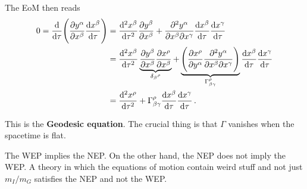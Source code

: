 \documentclass[main.tex]{subfiles}
\begin{document}
The EoM then reads 
%
\begin{subequations}
\begin{align}
0 = \dv{}{\tau } \qty(\pdv{y^{\alpha }}{x^{\beta }} \dv{x^{\beta }}{\tau }) 
&=  \dv[2]{x^{\beta }}{\tau } \pdv{y^{\beta }}{x^{\beta }} 
+ \pdv[2]{y^{\alpha }}{x^{\beta }}{x^{\gamma }} \dv{x^{\beta }}{\tau } \dv{x^{\gamma }}{\tau }  \\
&= \dv[2]{x^{\beta }}{\tau } \underbrace{\pdv{y^{\beta }}{x^{\beta }}
\pdv{x^{\rho }}{x^{\beta }}}_{ \delta_{\beta }{}^{\rho }} 
+ \underbrace{\qty( \pdv{x^{\rho }}{y^{\alpha }} \pdv[2]{y^{\alpha }}{x^{\beta }}{x^{\gamma }} )}_{ \Gamma^{\rho }_{\beta \gamma }}
\dv{x^{\beta }}{\tau }  \dv{x^{\gamma }}{\tau }  \\
&= \dv[2]{x^{\rho }}{\tau } + \Gamma^{\rho }_{\beta \gamma } \dv{x^{\beta }}{\tau }  \dv{x^{\gamma }}{\tau }
\,.
\end{align}
\end{subequations}

This is the \textbf{Geodesic equation}.
The crucial thing is that \(\Gamma \) vanishes when the spacetime is flat. 

The WEP implies the NEP. 
On the other hand, the NEP does not imply the WEP. 
A theory in which the equations of motion contain weird stuff and not just \(m_I / m_G\) satisfies the NEP and not the WEP. 

\end{document}
